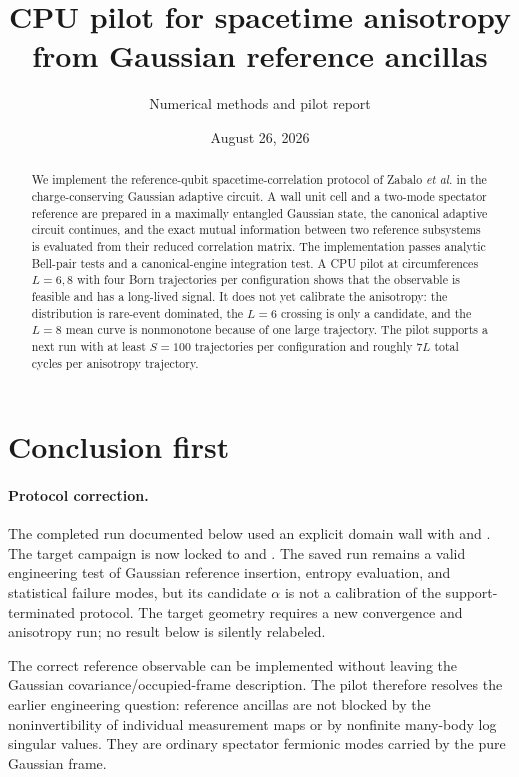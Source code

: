 \documentclass[10pt]{article}
\title{CPU pilot for spacetime anisotropy from Gaussian reference ancillas}
\author{Numerical methods and pilot report}
\date{August 26, 2026}
\begin{document}
\maketitle

\begin{abstract}
We implement the reference-qubit spacetime-correlation protocol of Zabalo
\emph{et al.} in the charge-conserving Gaussian adaptive circuit.  A wall unit
cell and a two-mode spectator reference are prepared in a maximally entangled
Gaussian state, the canonical adaptive circuit continues, and the exact mutual
information between two reference subsystems is evaluated from their reduced
correlation matrix.  The implementation passes analytic Bell-pair tests and a
canonical-engine integration test.  A CPU pilot at circumferences $L=6,8$ with
four Born trajectories per configuration shows that the observable is feasible
and has a long-lived signal.  It does not yet calibrate the anisotropy: the
distribution is rare-event dominated, the $L=6$ crossing is only a candidate,
and the $L=8$ mean curve is nonmonotone because of one large trajectory.  The
pilot supports a next run with at least $S=100$ trajectories per configuration
and roughly $7L$ total cycles per anisotropy trajectory.
\end{abstract}

\section{Conclusion first}

\paragraph{Protocol correction.}
The completed run documented below used an explicit domain wall with
 and .  The target
campaign is now locked to  and
.  The saved run remains a valid engineering
test of Gaussian reference insertion, entropy evaluation, and statistical
failure modes, but its candidate $\alpha$ is not a calibration of the
support-terminated protocol.  The target geometry requires a new convergence
and anisotropy run; no result below is silently relabeled.

The correct reference observable can be implemented without leaving the
Gaussian covariance/occupied-frame description.  The pilot therefore resolves
the earlier engineering question: reference ancillas are not blocked by the
noninvertibility of individual measurement maps or by nonfinite many-body log
singular values.  They are ordinary spectator fermionic modes carried by the
pure Gaussian frame.
\end{document}

